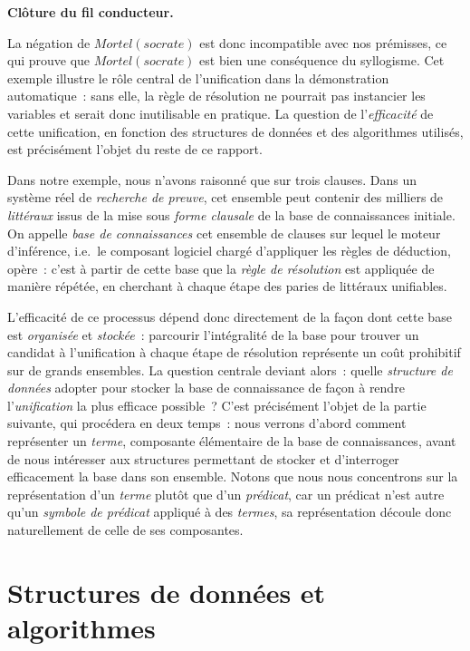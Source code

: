 \documentclass[11pt]{article}
\newenvironment{paraph}[1]{%
  \medskip
  \noindent\textbf{#1.}\quad

  \vspace{0.2cm}
}{%
  \medskip
}
\begin{document}
\begin{paraph}{Clôture du fil conducteur}
La négation de $\mathit{Mortel}(\mathit{socrate})$ est donc incompatible 
avec nos prémisses, ce qui prouve que $\mathit{Mortel}(\mathit{socrate})$ 
est bien une conséquence du syllogisme. Cet exemple illustre le rôle 
central de l'unification dans la démonstration automatique~: 
sans elle, la règle de résolution ne pourrait pas instancier 
les variables et serait donc inutilisable en pratique. La question 
de l'\textit{efficacité} de cette unification, en fonction des 
structures de données et des algorithmes utilisés, est précisément 
l'objet du reste de ce rapport.
\end{paraph}

\vspace{0.2cm}
Dans notre exemple, nous n'avons raisonné que sur trois clauses. Dans
un système réel de \textit{recherche de preuve}, cet ensemble peut contenir
des milliers de \textit{littéraux} issus de la mise sous \textit{forme clausale}
de la base de connaissances initiale. On appelle \textit{base de connaissances} cet
ensemble de clauses sur lequel le moteur d'inférence, i.e.~le composant logiciel chargé 
d'appliquer les règles de déduction, opère~: c'est à partir
de cette base que la \textit{règle de résolution} est appliquée de manière répétée,
en cherchant à chaque étape des paries de littéraux unifiables.

\vspace{0.2cm}
L'efficacité de ce processus dépend donc directement de la façon dont cette 
base est \textit{organisée} et \textit{stockée}~: parcourir
l'intégralité de la base pour trouver un candidat à l'unification à chaque étape
de résolution représente un coût prohibitif sur de grands ensembles.
La question centrale deviant alors~: quelle \textit{structure de données} adopter
pour stocker la base de connaissance de façon à rendre l'\textit{unification} la plus
efficace possible~? C'est précisément l'objet de la partie suivante, 
qui procédera en deux temps~: nous verrons d'abord comment représenter 
un \textit{terme}, composante élémentaire de la base de connaissances, 
avant de nous intéresser aux structures permettant de stocker et 
d'interroger efficacement la base dans son ensemble. Notons que nous 
nous concentrons sur la représentation d'un \textit{terme} plutôt que 
d'un \textit{prédicat}, car un prédicat n'est autre qu'un 
\textit{symbole de prédicat} appliqué à des \textit{termes}, sa 
représentation découle donc naturellement de celle de ses composantes.

\newpage
\section{Structures de données et algorithmes}
\end{document}
